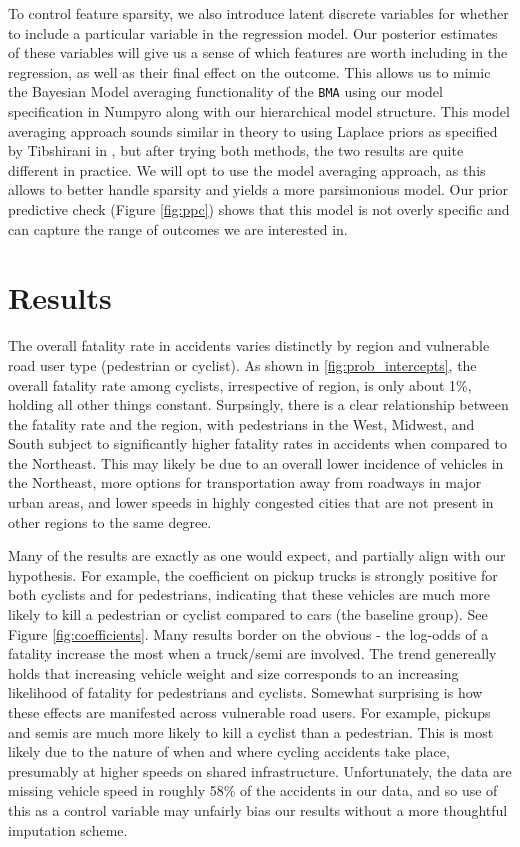 \documentclass[12pt]{article}
\begin{document}
To control feature sparsity, we also introduce latent discrete variables for whether to include a particular
variable in the regression model. Our posterior estimates of these variables will give us a sense of which features
are worth including in the regression, as well as their final effect on the outcome. This allows us to mimic the
Bayesian Model averaging functionality of the \texttt{BMA}\cite{raftery_bma_2022} using our model specification in
Numpyro\cite{phan_composable_2019} along with our hierarchical model structure. This model averaging approach sounds
similar in theory to using Laplace priors as specified by Tibshirani in \cite{tibshirani_regression_1996},
but after trying both methods, the two results are quite different in practice. We will opt to use the model
averaging approach, as this allows to better handle sparsity and yields a more parsimonious model.
Our prior predictive check (Figure \ref{fig:ppc}) shows that this model is not overly specific and can capture the
range of outcomes we are interested in.

\section{Results}

The overall fatality rate in accidents varies distinctly by region and vulnerable road user
type (pedestrian or cyclist). As shown in \ref{fig:prob_intercepts}, the overall fatality rate
among cyclists, irrespective of region, is only about 1\%, holding all other things constant. Surpsingly,
there is a clear relationship between the fatality rate and the region, with pedestrians in the West, Midwest, and South
subject to significantly higher fatality rates in accidents when compared to the Northeast. This may likely
be due to an overall lower incidence of vehicles in the Northeast, more options for transportation away from roadways
in major urban areas, and lower speeds in highly congested cities that are not present in other regions to the
same degree.

Many of the results are exactly as one would expect, and partially align with our hypothesis. For example, the
coefficient on pickup trucks is strongly positive for both cyclists and for pedestrians, indicating that these vehicles
are much more likely to kill a pedestrian or cyclist compared to cars (the baseline group). See
Figure \ref{fig:coefficients}. Many results border on the obvious - the log-odds of a fatality increase the most when
a truck/semi are involved. The trend genereally holds that increasing vehicle weight and size corresponds to an increasing
likelihood of fatality for pedestrians and cyclists. Somewhat surprising is how these effects are manifested across
vulnerable road users. For example, pickups and semis are much more likely to kill a cyclist than a pedestrian. This is
most likely due to the nature of when and where cycling accidents take place, presumably at higher speeds on shared
infrastructure. Unfortunately, the data are missing vehicle speed in roughly 58\% of the accidents in our data, and so
use of this as a control variable may unfairly bias our results without a more thoughtful imputation scheme.
\end{document}

